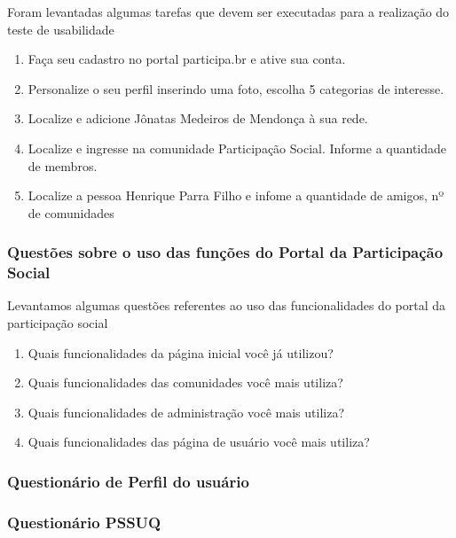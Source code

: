 	Foram levantadas algumas tarefas que devem ser executadas para a realização do teste de usabilidade

\begin{enumerate}
	\item Faça seu cadastro no portal participa.br e ative sua conta.
	\item Personalize o seu perfil inserindo uma foto, escolha 5 categorias de interesse.
	\item Localize e adicione Jônatas Medeiros de Mendonça à sua rede.
	\item Localize e ingresse na comunidade Participação Social. Informe a quantidade de membros.
	\item Localize a pessoa Henrique Parra Filho e infome a quantidade de amigos, nº de comunidades 
\end{enumerate}

\subsubsection{Questões sobre o uso das funções do Portal da Participação Social}

	Levantamos algumas questões referentes ao uso das funcionalidades do portal da participação social	

\begin{enumerate}
	\item Quais funcionalidades da página inicial você já utilizou?
	\item Quais funcionalidades das comunidades você mais utiliza?
	\item Quais funcionalidades de administração você mais utiliza? 
	\item Quais funcionalidades das página de usuário você mais utiliza?
\end{enumerate}


\subsubsection{Questionário de Perfil do usuário}


\subsubsection{Questionário PSSUQ}

		

